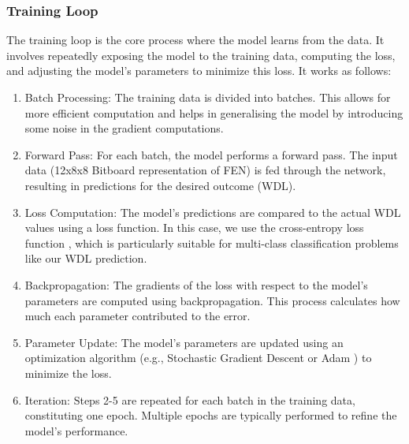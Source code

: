 \subsubsection{Training Loop}
The training loop is the core process where the model learns from the data. It involves repeatedly exposing the model to the training data, computing the loss, and adjusting the model's parameters to minimize this loss. It works as follows:

\begin{enumerate}
    \item Batch Processing: The training data is divided into batches. This allows for more efficient computation and helps in generalising the model by introducing some noise in the gradient computations.
    \item Forward Pass: For each batch, the model performs a forward pass. The input data (12x8x8 Bitboard representation of FEN) is fed through the network, resulting in predictions for the desired outcome (WDL).
    \item Loss Computation: The model's predictions are compared to the actual WDL values using a loss function. In this case, we use the cross-entropy loss function \cite{mao2023crossentropylossfunctionstheoretical}, which is particularly suitable for multi-class classification problems like our WDL prediction.
    \item Backpropagation: The gradients of the loss with respect to the model's parameters are computed using backpropagation. This process calculates how much each parameter contributed to the error.
    \item Parameter Update: The model's parameters are updated using an optimization algorithm (e.g., Stochastic Gradient Descent or Adam \cite{Goodfellow-et-al-2016}) to minimize the loss.
    \item Iteration: Steps 2-5 are repeated for each batch in the training data, constituting one epoch. Multiple epochs are typically performed to refine the model's performance.
    
\end{enumerate}

